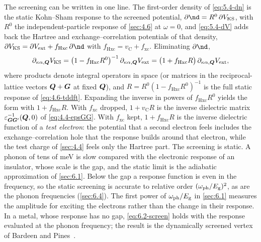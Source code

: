 The screening can be written in one line. The first-order density of \cref{eq:5.4-dn} is the static Kohn--Sham response to the screened potential, $\partial\nd = R^0\,\partial V_{\mathrm{KS}}$, with $R^0$ the independent-particle response of \cref{sec:4.6} at $\omega = 0$, and \cref{eq:5.4-dV} adds back the Hartree and exchange--correlation potentials of that density, $\partial V_{\mathrm{KS}} = \partial V_{\mathrm{ext}} + f_{\mathrm{Hxc}}\,\partial\nd$ with $f_{\mathrm{Hxc}} = v_{\mathrm{C}} + f_{\mathrm{xc}}$. Eliminating $\partial\nd$,
\begin{equation}
  \partial_{\kappa\alpha,\bm{Q}}V_{\mathrm{KS}} = \bigl(1 - f_{\mathrm{Hxc}}R^0\bigr)^{-1}\,\partial_{\kappa\alpha,\bm{Q}}V_{\mathrm{ext}}
  = \bigl(1 + f_{\mathrm{Hxc}}R\bigr)\,\partial_{\kappa\alpha,\bm{Q}}V_{\mathrm{ext}} ,
  \label{eq:6.2-screen}
\end{equation}
where products denote integral operators in space (or matrices in the reciprocal-lattice vectors $\bm{Q}+\bm{G}$ at fixed $\bm{Q}$), and $R = R^0(1 - f_{\mathrm{Hxc}}R^0)^{-1}$ is the full static response of \cref{eq:4.6-tddft}. Expanding the inverse in powers of $f_{\mathrm{Hxc}}R^0$ yields the form with $1 + f_{\mathrm{Hxc}}R$. With $f_{\mathrm{xc}}$ dropped, $1 + v_{\mathrm{C}}R$ is the inverse dielectric matrix $\varepsilon^{-1}_{\bm{G}\bm{G}'}(\bm{Q},0)$ of \cref{eq:4.4-epsGG}. With $f_{\mathrm{xc}}$ kept, $1 + f_{\mathrm{Hxc}}R$ is the inverse dielectric function of a \emph{test electron}: the potential that a second electron feels includes the exchange--correlation hole that the response builds around that electron, while the test charge of \cref{sec:4.4} feels only the Hartree part. The screening is static. A phonon of tens of meV is slow compared with the electronic response of an insulator, whose scale is the gap, and the static limit is the adiabatic approximation of \cref{sec:6.1}. Below the gap a response function is even in the frequency, so the static screening is accurate to relative order $(\omega_{\mathrm{ph}}/E_{\mathrm{g}})^2$, as are the phonon frequencies (\cref{sec:6.4}). The first power of $\omega_{\mathrm{ph}}/E_{\mathrm{g}}$ in \cref{sec:6.1} measures the amplitude for exciting the electrons rather than the change in their response. In a metal, whose response has no gap, \cref{eq:6.2-screen} holds with the response evaluated at the phonon frequency; the result is the dynamically screened vertex of Bardeen and Pines~\cite{bardeen1955electron}.

